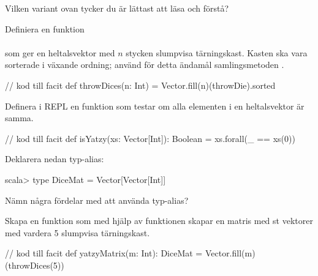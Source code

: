 \Subtask\Pen Vilken variant ovan tycker du är lättast att läsa och förstå?

\Subtask Definiera en funktion \\ \\ som ger en heltalsvektor med $n$ stycken slumpvisa tärningskast. Kasten ska vara sorterade i växande ordning; använd för detta ändamål samlingsmetoden .
\begin{Code}
// kod till facit
def throwDices(n: Int) = Vector.fill(n)(throwDie).sorted
\end{Code}


\Subtask Definera i REPL en funktion  som testar om alla elementen i en heltalsvektor är samma. 
\begin{Code}
// kod till facit
def isYatzy(xs: Vector[Int]): Boolean = xs.forall(_ == xs(0))
\end{Code}

\Subtask Deklarera nedan typ-alias: 
\begin{REPL}
scala> type DiceMat = Vector[Vector[Int]]
\end{REPL}
\Subtask\Pen Nämn några fördelar med att använda typ-alias?


{\color{red}{TODO: Till facit: (1) Slipper skriva långa typer om och om igen; kan i stället använda kortare namn (2) kan lätt ändra typ senare genom att bara ändra på ett ställe (3) Koden blir lättare att begripa då typnamnet kan hjälpa till att beskriva vad typen används till på samma sätt som en klass, men man behöver inte skapa en klass -- det kan göras senare om behov uppstår.}}


\Subtask Skapa en funktion  som med hjälp av funktionen  skapar en matris med  st vektorer med vardera 5 slumpvisa tärningskast.
\begin{Code}
// kod till facit
def yatzyMatrix(m: Int): DiceMat = Vector.fill(m)(throwDices(5))
\end{Code}

